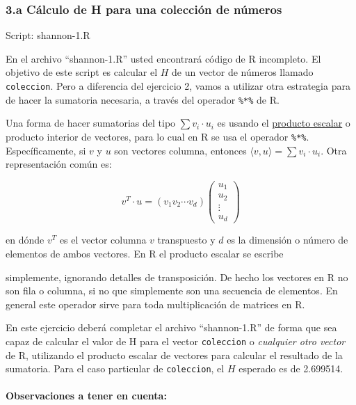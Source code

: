\documentclass[]{article}
\newenvironment{Shaded}{}{}
\newcommand{\NormalTok}[1]{{#1}}
\begin{document}
\subsubsection{3.a Cálculo de H para una colección de números}

Script: shannon-1.R

En el archivo ``shannon-1.R'' usted encontrará código de R incompleto.
El objetivo de este script es calcular el $H$ de un vector de números
llamado \texttt{coleccion}. Pero a diferencia del ejercicio 2, vamos a
utilizar otra estrategia para de hacer la sumatoria necesaria, a través
del operador \texttt{\%*\%} de R.

Una forma de hacer sumatorias del tipo $\sum v_i \cdot u_i$ es usando el
\href{https://es.wikipedia.org/wiki/Producto\_escalar}{producto escalar}
o producto interior de vectores, para lo cual en R se usa el operador
\texttt{\%*\%}. Específicamente, si $v$ y $u$ son vectores columna,
entonces $\langle v, u \rangle = \sum v_i \cdot u_i$. Otra
representación común es:

\[
  v^T \cdot u = (v_1 v_2 \cdots v_d)
    \begin{pmatrix}
      u_1 \\
      u_2 \\
      \vdots \\
      u_d
    \end{pmatrix}
\]

en dónde $v^T$ es el vector columna $v$ transpuesto y $d$ es la
dimensión o número de elementos de ambos vectores. En R el producto
escalar se escribe

\begin{Shaded}
\end{Shaded}
simplemente, ignorando detalles de transposición. De hecho los vectores
en R no son fila o columna, si no que simplemente son una secuencia de
elementos. En general este operador sirve para toda multiplicación de
matrices en R.

En este ejercicio deberá completar el archivo ``shannon-1.R'' de forma
que sea capaz de calcular el valor de H para el vector
\texttt{coleccion} o \emph{cualquier otro vector} de R, utilizando el
producto escalar de vectores para calcular el resultado de la sumatoria.
Para el caso particular de \texttt{coleccion}, el $H$ esperado es de
2.699514.

\paragraph{Observaciones a tener en cuenta:}
\end{document}
